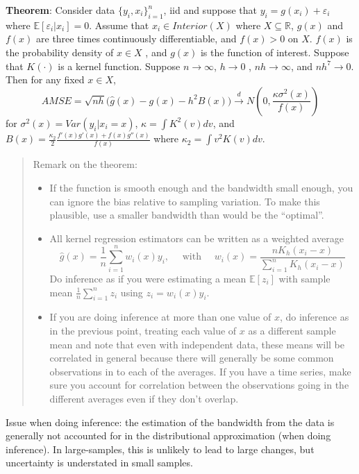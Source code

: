 \documentclass[12pt,]{book}
\providecommand{\tightlist}{%
  \setlength{\itemsep}{0pt}\setlength{\parskip}{0pt}}
\begin{document}
\textbf{Theorem}:
Consider data \(\{ y_i, x_i \}_{i=1}^n\), iid and suppose that \(y_i = g(x_i) + \varepsilon_i\) where \(\mathbb E[\varepsilon_i|x_i] = 0\). Assume that \(x_i \in Interior(X)\) where \(X \subseteq \mathbb R\), \(g(x)\) and \(f(x)\) are three times continuously differentiable, and \(f(x) > 0\) on \(X\). \(f(x)\) is the probability density of \(x \in X\) , and \(g(x)\) is the function of interest. Suppose that \(K(\cdot)\) is a kernel function. Suppose \(n\to\infty\), \(h\to0\) , \(nh\to\infty\), and \(nh^7\to0\). Then for any fixed \(x\in X\),
\[
  AMSE = \sqrt{nh} \Big( \hat{g}(x) - g(x) - h^2 B(x)\Big) \overset{d}{\to} N \left( 0, \frac{\kappa \sigma^2(x)}{f(x)}\right)
\]
for \(\sigma^2(x) = Var(y_i|x_i = x)\), \(\kappa = \int K^2(v)dv\), and \(B(x) = \frac{\kappa_2}{2} \frac{f'(x)g'(x) + f(x) g''(x)}{f(x)}\) where \(\kappa_2 = \int v^2 K(v)dv\).

\begin{quote}
Remark on the theorem:

\begin{itemize}
\tightlist
\item
  If the function is smooth enough and the bandwidth small enough, you can ignore the bias relative to sampling variation. To make this plausible, use a smaller bandwidth than would be the ``optimal''.
\item
  All kernel regression estimators can be written as a weighted average
  \[
  \hat{g}(x) = \frac{1}{n} \sum_{i=1}^n w_i (x) y_i, \quad \text{ with } \quad w_i (x) = \frac{n K_h (x_i - x)}{\sum_{i=1}^n K_h (x_i - x)} 
  \]
  Do inference as if you were estimating a mean \(\mathbb E[z_i]\) with sample mean \(\frac{1}{n} \sum_{i=1}^n z_i\) using \(z_i = w_i (x) y_i\).
\item
  If you are doing inference at more than one value of \(x\), do inference as in the previous point, treating each value of \(x\) as a different sample mean and note that even with independent data, these means will be correlated in general because there will generally be some common observations in to each of the averages. If you have a time series, make sure you account for correlation between the observations going in the different averages even if they don't overlap.
\end{itemize}
\end{quote}

Issue when doing inference: the estimation of the bandwidth from the data is generally not accounted for in the distributional approximation (when doing inference). In large-samples, this is unlikely to lead to large changes, but uncertainty is understated in small samples.
\end{document}
